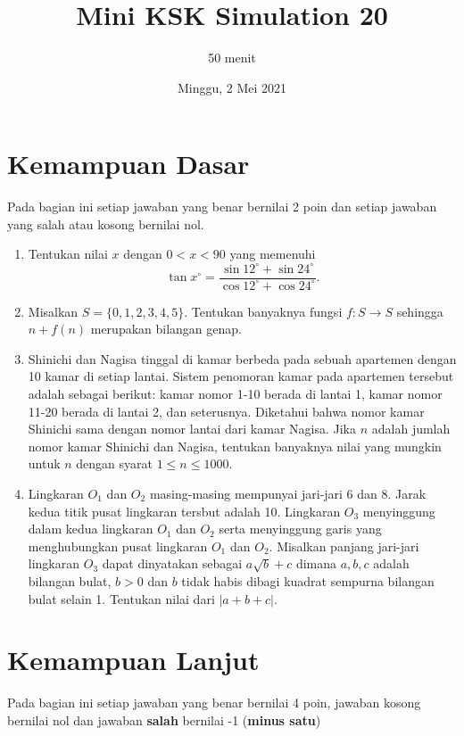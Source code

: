 \documentclass[12pt]{scrartcl}
\title{Mini KSK Simulation 20}
\author{50 menit}
\date{Minggu, 2 Mei 2021}
\begin{document}
	\maketitle

\renewcommand*\contentsname{Daftar Isi}
\tableofcontents

\newpage
	
	\section{Kemampuan Dasar}
	Pada bagian ini setiap jawaban yang benar bernilai 2 poin dan setiap jawaban yang salah
	atau kosong bernilai nol.
	\begin{enumerate}
		\item Tentukan nilai $x$ dengan $0 < x < 90$ yang memenuhi $$\tan x^\circ = \frac{\sin 12^\circ + \sin 24^\circ}{\cos 12^\circ + \cos 24^\circ}.$$
		
		\item Misalkan $S = \{0,1,2,3,4,5\}.$ Tentukan banyaknya fungsi $f:S\rightarrow S$ sehingga $n+f(n)$ merupakan bilangan genap.
		
		\item Shinichi dan Nagisa tinggal di kamar berbeda pada sebuah apartemen dengan 10 kamar di setiap lantai. Sistem penomoran kamar pada apartemen tersebut adalah sebagai berikut: kamar nomor 1-10 berada di lantai 1, kamar nomor 11-20 berada di lantai 2, dan seterusnya. Diketahui bahwa nomor kamar Shinichi sama dengan nomor lantai dari kamar Nagisa. Jika $n$ adalah jumlah nomor kamar Shinichi dan Nagisa, tentukan banyaknya nilai yang mungkin untuk $n$ dengan syarat $1 \le n \le 1000.$
		
		\item Lingkaran $O_1$ dan $O_2$ masing-masing mempunyai jari-jari 6 dan 8. Jarak kedua titik pusat lingkaran tersbut adalah 10. Lingkaran $O_3$ menyinggung dalam kedua lingkaran $O_1$ dan $O_2$ serta menyinggung garis yang menghubungkan pusat lingkaran $O_1$ dan $O_2$. Misalkan panjang jari-jari lingkaran $O_3$ dapat dinyatakan sebagai $a\sqrt{b}+c$ dimana $a,b,c$ adalah bilangan bulat, $b>0$ dan $b$ tidak habis dibagi kuadrat sempurna bilangan bulat selain 1. Tentukan nilai dari $|a+b+c|$.
		\newpage
	\end{enumerate}

\section{Kemampuan Lanjut}
Pada bagian ini setiap jawaban yang benar bernilai 4 poin, jawaban kosong bernilai nol
dan jawaban \textbf{salah} bernilai -1 (\textbf{minus satu})
\end{document}
